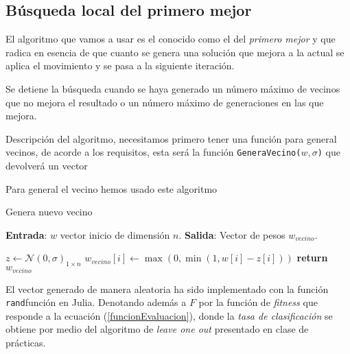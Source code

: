 \subsection{Búsqueda local del primero mejor}  

El algoritmo que vamos a usar es el conocido como el del \textit{primero mejor} y que radica en esencia de que  cuanto se genera 
una solución que mejora a la actual se aplica el movimiento y se pasa a la siguiente iteración.

Se detiene la búsqueda cuando se haya generado un número máximo de vecinos que no mejora el resultado
o un número máximo de generaciones en las que mejora.

Descripción del algoritmo, necesitamos primero tener una función para general vecinos, de acorde a los requisitos, esta será 
la función \texttt{GeneraVecino($w,\sigma$)} que devolverá un vector 


  Para general el vecino hemos usado este algoritmo 

  \begin{algorithm}[H]
    \caption{Genera nuevo vecino}
    \hspace*{\algorithmicindent} 

        \textbf{Entrada}: $w$ vector inicio de dimensión $n$. 
        \hspace*{\algorithmicindent} 
        \textbf{Salida}:
        Vector de pesos $w_{vecino}$.        
    \begin{algorithmic}[1]
          \State $z \gets \mathcal{N}(0, \sigma)_{1 \times n}$
          \State $w_{vecino}[i] \gets \max(0, \min(1, w[i]-z[i]))$
        \EndFor
        \State \textbf{return} $w_{vecino}$
      \EndProcedure
    \end{algorithmic}
  \end{algorithm}

El vector generado de manera aleatoria ha sido implementado con la función \texttt{rand}función en Julia.  
Denotando además a $F$ por la 
función de \textit{fitness} que responde a la ecuación 
(\ref{funcionEvaluacion}), 
donde la \textit{tasa de clasificación} se obtiene por medio del algoritmo de 
\textit{leave one out} presentado en clase de prácticas.

